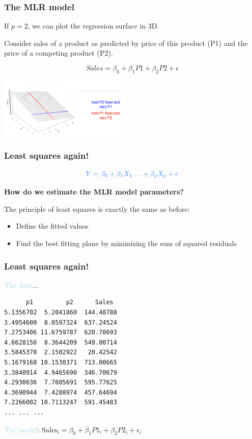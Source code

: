 \documentclass{beamer}
\newcommand{\bo}[1]{\textcolor{burntorange}{#1}}
\newcommand{\lb}[1]{\textcolor{lightblue}{#1}}
\newcommand{\bl}{\color{lightblue}}
\newcommand{\rd}{\color{burntorange}}
\newcommand{\bk}{\color{black}}
\newcommand{\bi}{\begin{itemize}}
\newcommand{\ib}{\end{itemize}}
\newcommand{\p}{\item}
\newcommand{\sk}{\vspace{.5cm}}
\begin{document}

\begin{frame}
\frametitle{The MLR model}

\sk
If $p=2$, we can plot the regression surface in 3D. \\ \sk

Consider  sales of a product as predicted by price of this 
product ({\bl P1}) and the price of a competing product ({\rd P2}). 


$$
Sales = \beta_0 + \beta_1 P1 + \beta_2 P2 + \epsilon
$$
\vspace{-0.7cm}
\begin{center}
\includegraphics[width=2.5in]{figures/plane}
\end{center}
\end{frame}

\begin{frame}
\frametitle{Least squares again!}  

\[\bl \large Y  = \beta_0 + \beta_1 X_1 \ldots
+ \beta_p X_p + \varepsilon\]

\sk
{\bf How do we estimate the MLR model parameters?}

\sk
The principle of \bo{least squares} is exactly the same as before: \sk
\bi
\p Define the fitted values 
\p Find the best fitting plane by minimizing the sum of squared 
residuals
\ib

\end{frame}

\begin{frame}[containsverbatim]
\frametitle{Least squares again!}

\lb{The data}...
\begin{verbatim}
      p1         p2      Sales  
5.1356702  5.2041860  144.48788 
3.4954600  8.0597324  637.24524 
7.2753406 11.6759787  620.78693 
4.6628156  8.3644209  549.00714 
3.5845370  2.1502922   20.42542 
5.1679168 10.1530371  713.00665 
3.3840914  4.9465690  346.70679 
4.2930636  7.7605691  595.77625 
4.3690944  7.4288974  457.64694 
7.2266002 10.7113247  591.45483 
... ... ... 
\end{verbatim}

\lb{The model}: \bk $\text{Sales}_i = \beta_0 + \beta_1P1_i + \beta_2 P2_i + \epsilon_i$


\end{frame}
\end{document}

